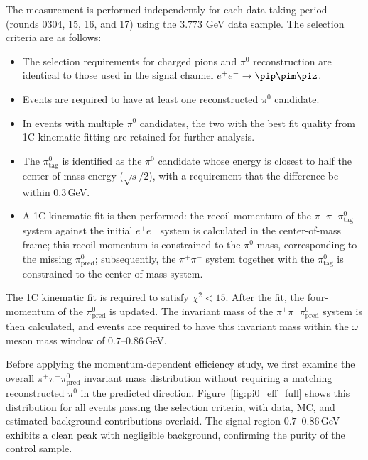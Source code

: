 The measurement is performed independently for each data-taking period (rounds 0304, 15, 16, and 17) using the $3.773$ GeV data sample. The selection criteria are as follows:
\begin{itemize}
    \item The selection requirements for charged pions and $\pi^0$ reconstruction are identical to those used in the signal channel $e^+e^- \to \pip\pim\piz$.
    \item Events are required to have at least one reconstructed $\pi^0$ candidate.
    \item In events with multiple $\pi^0$ candidates, the two with the best fit quality from 1C kinematic fitting are retained for further analysis.
    \item The $\pi^0_{\text{tag}}$ is identified as the $\pi^0$ candidate whose energy is closest to half the center-of-mass energy ($\sqrt{s}/2$), with a requirement that the difference be within 0.3\,GeV.
    \item A 1C kinematic fit is then performed: the recoil momentum of the $\pi^+\pi^-\pi^0_{\text{tag}}$ system against the initial $e^+e^-$ system is calculated in the center-of-mass frame; this recoil momentum is constrained to the $\pi^0$ mass, corresponding to the missing $\pi^0_{\text{pred}}$; subsequently, the $\pi^+\pi^-$ system together with the $\pi^0_{\text{tag}}$ is constrained to the center-of-mass system.
\end{itemize}
The 1C kinematic fit is required to satisfy $\chi^2 < 15$. After the fit, the four-momentum of the $\pi^0_{\text{pred}}$ is updated. The invariant mass of the $\pi^+\pi^-\pi^0_{\text{pred}}$ system is then calculated, and events are required to have this invariant mass within the $\omega$ meson mass window of $0.7$--$0.86$\,GeV.

Before applying the momentum-dependent efficiency study, we first examine the overall $\pi^+\pi^-\pi^0_{\text{pred}}$ invariant mass distribution without requiring a matching reconstructed $\pi^0$ in the predicted direction. Figure~\ref{fig:pi0_eff_full} shows this distribution for all events passing the selection criteria, with data, MC, and estimated background contributions overlaid. The signal region $0.7$--$0.86$\,GeV exhibits a clean peak with negligible background, confirming the purity of the control sample.

